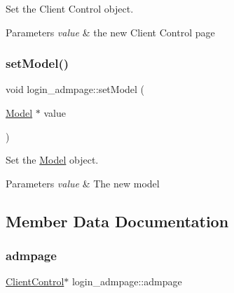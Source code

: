 Set the Client Control object. 


\begin{DoxyParams}{Parameters}
{\em value} & the new Client Control page \\
\hline
\end{DoxyParams}
\mbox{\label{classlogin__admpage_a352ce22e69379a399169ce1f298a613e}} 
\subsubsection{\texorpdfstring{set\+Model()}{setModel()}}
{\footnotesize\ttfamily void login\+\_\+admpage\+::set\+Model (\begin{DoxyParamCaption}\item[{\hyperlink{classModel}{Model} $\ast$}]{value }\end{DoxyParamCaption})}



Set the \hyperlink{classModel}{Model} object. 


\begin{DoxyParams}{Parameters}
{\em value} & The new model \\
\hline
\end{DoxyParams}


\subsection{Member Data Documentation}
\mbox{\label{classlogin__admpage_aff7598c838503fc7bd8cf0754199e278}} 
\subsubsection{\texorpdfstring{admpage}{admpage}}
{\footnotesize\ttfamily \hyperlink{classClientControl}{Client\+Control}$\ast$ login\+\_\+admpage\+::admpage\hspace{0.3cm}{\ttfamily [private]}}

\mbox{\label{classlogin__admpage_a6bef6e4a441d314925df6759abf81fd4}} 
